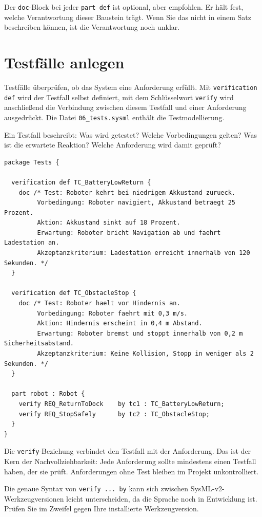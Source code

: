 Der \texttt{doc}-Block bei jeder \texttt{part def} ist optional, aber empfohlen. Er hält fest, welche Verantwortung dieser Baustein trägt. Wenn Sie das nicht in einem Satz beschreiben können, ist die Verantwortung noch unklar.

\section{Testfälle anlegen}

Testfälle überprüfen, ob das System eine Anforderung erfüllt. Mit \texttt{verification def} wird der Testfall selbst definiert, mit dem Schlüsselwort \texttt{verify} wird anschließend die Verbindung zwischen diesem Testfall und einer Anforderung ausgedrückt. Die Datei \texttt{06\_tests.sysml} enthält die Testmodellierung.

Ein Testfall beschreibt: Was wird getestet? Welche Vorbedingungen gelten? Was ist die erwartete Reaktion? Welche Anforderung wird damit geprüft?

\begin{lstlisting}
package Tests {

  verification def TC_BatteryLowReturn {
    doc /* Test: Roboter kehrt bei niedrigem Akkustand zurueck.
         Vorbedingung: Roboter navigiert, Akkustand betraegt 25 Prozent.
         Aktion: Akkustand sinkt auf 18 Prozent.
         Erwartung: Roboter bricht Navigation ab und faehrt Ladestation an.
         Akzeptanzkriterium: Ladestation erreicht innerhalb von 120 Sekunden. */
  }

  verification def TC_ObstacleStop {
    doc /* Test: Roboter haelt vor Hindernis an.
         Vorbedingung: Roboter faehrt mit 0,3 m/s.
         Aktion: Hindernis erscheint in 0,4 m Abstand.
         Erwartung: Roboter bremst und stoppt innerhalb von 0,2 m Sicherheitsabstand.
         Akzeptanzkriterium: Keine Kollision, Stopp in weniger als 2 Sekunden. */
  }

  part robot : Robot {
    verify REQ_ReturnToDock    by tc1 : TC_BatteryLowReturn;
    verify REQ_StopSafely      by tc2 : TC_ObstacleStop;
  }
}
\end{lstlisting}

Die \texttt{verify}-Beziehung verbindet den Testfall mit der Anforderung. Das ist der Kern der Nachvollziehbarkeit: Jede Anforderung sollte mindestens einen Testfall haben, der sie prüft. Anforderungen ohne Test bleiben im Projekt unkontrolliert.

Die genaue Syntax von \texttt{verify ... by} kann sich zwischen SysML-v2-Werkzeugversionen leicht unterscheiden, da die Sprache noch in Entwicklung ist. Prüfen Sie im Zweifel gegen Ihre installierte Werkzeugversion.

